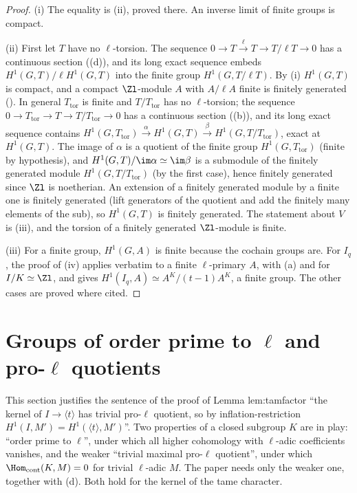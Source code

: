 \begin{proof}
(i) The equality is (ii), proved there. An inverse limit of finite groups is compact.

(ii) First let $T$ have no $\ell$-torsion. The sequence $0\to T\xrightarrow{\ell}T\to T/\ell T\to0$ has a continuous section
((d)), and its long exact sequence embeds $H^1(G,T)/\ell H^1(G,T)$ into the finite group $H^1(G,T/\ell T)$. By (i) $H^1(G,T)$ is
compact, and a compact $\Zl$-module $A$ with $A/\ell A$ finite is finitely generated (). In general $T_{\mathrm{tor}}$ is
finite and $T/T_{\mathrm{tor}}$ has no $\ell$-torsion; the sequence $0\to T_{\mathrm{tor}}\to T\to T/T_{\mathrm{tor}}\to0$ has a continuous section
((b)), and its long exact sequence contains $H^1(G,T_{\mathrm{tor}})\xrightarrow{\alpha}H^1(G,T)\xrightarrow{\beta}H^1(G,T/T_{\mathrm{tor}})$, exact
at $H^1(G,T)$. The image of $\alpha$ is a quotient of the finite group $H^1(G,T_{\mathrm{tor}})$ (finite by hypothesis), and $H^1(G,T)/\im\alpha\simeq\im\beta$ is a submodule of
the finitely generated module $H^1(G,T/T_{\mathrm{tor}})$ (by the first case), hence finitely generated since $\Zl$ is noetherian. An extension of a finitely
generated module by a finite one is finitely generated (lift generators of the quotient and add the finitely many elements of the sub), so $H^1(G,T)$ is
finitely generated. The statement about $V$ is (iii), and the torsion of a finitely generated $\Zl$-module is finite.

(iii) For a finite group, $H^1(G,A)$ is finite because the cochain groups are. For $I_q$, the proof of (iv) applies verbatim to a finite
$\ell$-primary $A$, with (a) and  for $I/K\simeq\Zl$, and gives $H^1(I_q,A)\simeq A^K/(t-1)A^K$, a finite group.
The other cases are proved where cited.
\end{proof}

\section[Groups of order prime to l and pro-l quotients]{Groups of order prime to $\ell$ and pro-$\ell$ quotients}\label{sec:cohomology:prime-to-l}

This section justifies the sentence of the proof of Lemma lem:tamfactor ``the kernel of $I\to\langle t\rangle$ has trivial pro-$\ell$ quotient, so by
inflation-restriction $H^1(I,M')=H^1(\langle t\rangle,M')$''. Two properties of a closed subgroup $K$ are in play: ``order prime to $\ell$'', under which
all higher cohomology with $\ell$-adic coefficients vanishes, and the weaker ``trivial maximal pro-$\ell$ quotient'', under which $\Hom_{\mathrm{cont}}(K,M)=0$
for trivial $\ell$-adic $M$. The paper needs only the weaker one, together with (d). Both hold for the kernel of the tame
character.

